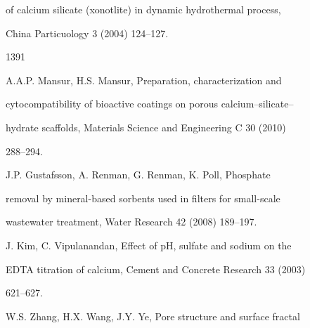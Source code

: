 \documentclass[a4paper,portrait,12pt]{article}
\begin{document}
\begin{flushleft}
of calcium silicate (xonotlite) in dynamic hydrothermal process,
\end{flushleft}


\begin{flushleft}
China Particuology 3 (2004) 124--127.
\end{flushleft}





1391





\begin{flushleft}
[21] A.A.P. Mansur, H.S. Mansur, Preparation, characterization and
\end{flushleft}


\begin{flushleft}
cytocompatibility of bioactive coatings on porous calcium--silicate--
\end{flushleft}


\begin{flushleft}
hydrate scaffolds, Materials Science and Engineering C 30 (2010)
\end{flushleft}


288--294.


\begin{flushleft}
[22] J.P. Gustafsson, A. Renman, G. Renman, K. Poll, Phosphate
\end{flushleft}


\begin{flushleft}
removal by mineral-based sorbents used in ﬁlters for small-scale
\end{flushleft}


\begin{flushleft}
wastewater treatment, Water Research 42 (2008) 189--197.
\end{flushleft}


\begin{flushleft}
[23] J. Kim, C. Vipulanandan, Effect of pH, sulfate and sodium on the
\end{flushleft}


\begin{flushleft}
EDTA titration of calcium, Cement and Concrete Research 33 (2003)
\end{flushleft}


621--627.


\begin{flushleft}
[24] W.S. Zhang, H.X. Wang, J.Y. Ye, Pore structure and surface fractal
\end{flushleft}
\end{document}
